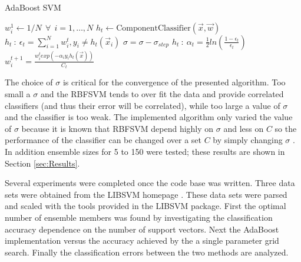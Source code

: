 \begin{algorithm}
\caption{AdaBoost SVM}
\label{algo:AdaBoostSVM}
\begin{algorithmic}[1]
\State $w_{i}^{1} \gets 1/N ~~\forall ~~ i=1,\dots,N$
    \label{marker}
    \State $h_t \gets \text{ComponentClassifier}(\vec{x},\vec{w})$
    \State $h_t~:~\epsilon_t = \sum_{i=1}^{N}w_{i}^{t} , y_i \ne h_t(\vec{x}_i)$
        \State $\sigma = \sigma - \sigma_{step}$
        \State {}
    \EndIf
    \State $h_t~:~\alpha_t = \frac{1}{2} ln\left ( \frac{1-\epsilon_t}{\epsilon_t}\right)$
    \State $w_i^{t+1} = \frac{w_i^{t} exp\left ( -\alpha_i y_i h_t(\vec{x})\right)}{C_t}$
\EndWhile
\Statex
{}
\EndProcedure
\end{algorithmic}
\end{algorithm}

The choice of $\sigma$ is critical for the convergence of the presented algorithm.
Too small a $\sigma$ and the RBFSVM tends to over fit the data and provide correlated classifiers (and thus their error will be correlated), while too large a value of $\sigma$ and the classifier is too weak.
The implemented algorithm only varied the value of $\sigma$ because it is known that RBFSVM depend highly on $\sigma$ and less on $C$ so the performance of the classifier can be changed over a set $C$ by simply changing $\sigma$ \cite{li_adaboost_2008}.
In addition ensemble sizes for 5 to 150 were tested; these results are shown in Section \ref{sec:Results}.

Several experiments were completed once the code base was written.
Three data sets were obtained from the LIBSVM homepage \cite{chang_libsvm:_2011}.
These data sets were parsed and scaled with the tools provided in the LIBSVM package.
First the optimal number of ensemble members was found by investigating the classification accuracy dependence on the number of support vectors.
Next the AdaBoost implementation versus the accuracy achieved by the a single parameter grid search.
Finally the classification errors between the two methods are analyzed.
